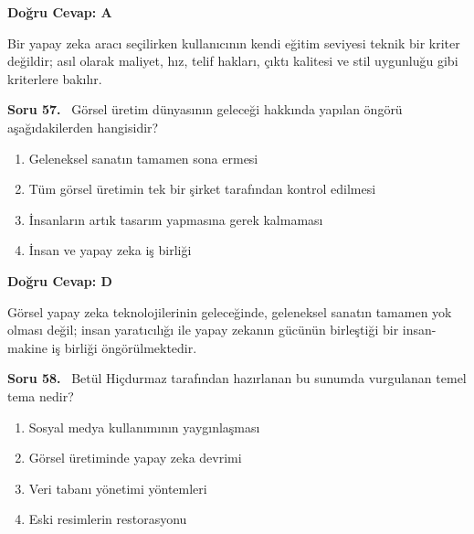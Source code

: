 \documentclass[11pt,a4paper,openany]{book}
\begin{document}
\vspace{4pt}
\begin{tcolorbox}[title=Cevap ve Açıklama, colback=gray!3!white, colframe=primarycolor!90!black, arc=2mm, fonttitle=\bfseries\sffamily, top=6pt, bottom=6pt]
    \textbf{Doğru Cevap: A}

    \vspace{2pt}
    Bir yapay zeka aracı seçilirken kullanıcının kendi eğitim seviyesi teknik bir kriter değildir; asıl olarak maliyet, hız, telif hakları, çıktı kalitesi ve stil uygunluğu gibi kriterlere bakılır.
\end{tcolorbox}
\vspace{10pt}
\needspace{5cm}
\vspace{8pt}
\noindent\textbf{\large\sffamily Soru 57.} \ Görsel üretim dünyasının geleceği hakkında yapılan öngörü aşağıdakilerden hangisidir?

\begin{enumerate}[label=\Alph*), leftmargin=25pt, topsep=4pt, itemsep=2pt]
        \item Geleneksel sanatın tamamen sona ermesi
        \item Tüm görsel üretimin tek bir şirket tarafından kontrol edilmesi
        \item İnsanların artık tasarım yapmasına gerek kalmaması
        \item İnsan ve yapay zeka iş birliği
\end{enumerate}

\vspace{4pt}
\begin{tcolorbox}[title=Cevap ve Açıklama, colback=gray!3!white, colframe=primarycolor!90!black, arc=2mm, fonttitle=\bfseries\sffamily, top=6pt, bottom=6pt]
    \textbf{Doğru Cevap: D}

    \vspace{2pt}
    Görsel yapay zeka teknolojilerinin geleceğinde, geleneksel sanatın tamamen yok olması değil; insan yaratıcılığı ile yapay zekanın gücünün birleştiği bir insan-makine iş birliği öngörülmektedir.
\end{tcolorbox}
\vspace{10pt}
\needspace{5cm}
\vspace{8pt}
\noindent\textbf{\large\sffamily Soru 58.} \ Betül Hiçdurmaz tarafından hazırlanan bu sunumda vurgulanan temel tema nedir?

\begin{enumerate}[label=\Alph*), leftmargin=25pt, topsep=4pt, itemsep=2pt]
        \item Sosyal medya kullanımının yaygınlaşması
        \item Görsel üretiminde yapay zeka devrimi
        \item Veri tabanı yönetimi yöntemleri
        \item Eski resimlerin restorasyonu
\end{enumerate}
\end{document}
